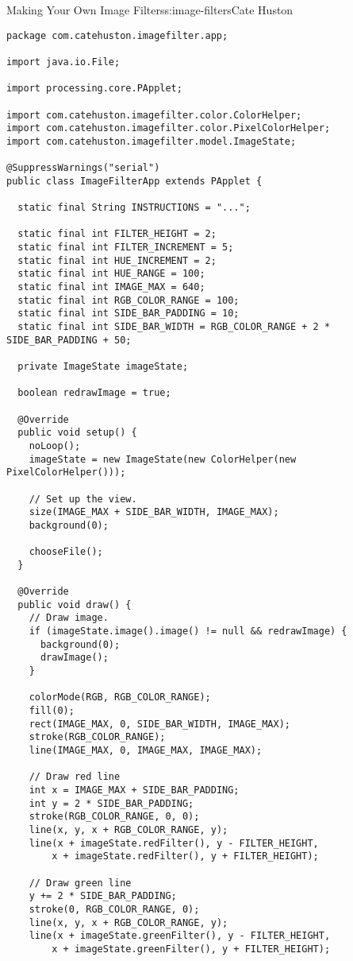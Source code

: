 \begin{aosachapter}{Making Your Own Image Filters}{s:image-filters}{Cate Huston}
\begin{verbatim}
package com.catehuston.imagefilter.app;

import java.io.File;

import processing.core.PApplet;

import com.catehuston.imagefilter.color.ColorHelper;
import com.catehuston.imagefilter.color.PixelColorHelper;
import com.catehuston.imagefilter.model.ImageState;

@SuppressWarnings("serial")
public class ImageFilterApp extends PApplet {

  static final String INSTRUCTIONS = "...";

  static final int FILTER_HEIGHT = 2;
  static final int FILTER_INCREMENT = 5;
  static final int HUE_INCREMENT = 2;
  static final int HUE_RANGE = 100;
  static final int IMAGE_MAX = 640;
  static final int RGB_COLOR_RANGE = 100;
  static final int SIDE_BAR_PADDING = 10;
  static final int SIDE_BAR_WIDTH = RGB_COLOR_RANGE + 2 * SIDE_BAR_PADDING + 50;

  private ImageState imageState;

  boolean redrawImage = true;

  @Override
  public void setup() {
    noLoop();
    imageState = new ImageState(new ColorHelper(new PixelColorHelper()));

    // Set up the view.
    size(IMAGE_MAX + SIDE_BAR_WIDTH, IMAGE_MAX);
    background(0);

    chooseFile();
  }

  @Override
  public void draw() {
    // Draw image.
    if (imageState.image().image() != null && redrawImage) {
      background(0);
      drawImage();
    }

    colorMode(RGB, RGB_COLOR_RANGE);
    fill(0);
    rect(IMAGE_MAX, 0, SIDE_BAR_WIDTH, IMAGE_MAX);
    stroke(RGB_COLOR_RANGE);
    line(IMAGE_MAX, 0, IMAGE_MAX, IMAGE_MAX);

    // Draw red line
    int x = IMAGE_MAX + SIDE_BAR_PADDING;
    int y = 2 * SIDE_BAR_PADDING;
    stroke(RGB_COLOR_RANGE, 0, 0);
    line(x, y, x + RGB_COLOR_RANGE, y);
    line(x + imageState.redFilter(), y - FILTER_HEIGHT,
        x + imageState.redFilter(), y + FILTER_HEIGHT);

    // Draw green line
    y += 2 * SIDE_BAR_PADDING;
    stroke(0, RGB_COLOR_RANGE, 0);
    line(x, y, x + RGB_COLOR_RANGE, y);
    line(x + imageState.greenFilter(), y - FILTER_HEIGHT,
        x + imageState.greenFilter(), y + FILTER_HEIGHT);


\end{verbatim}
\end{aosachapter}
